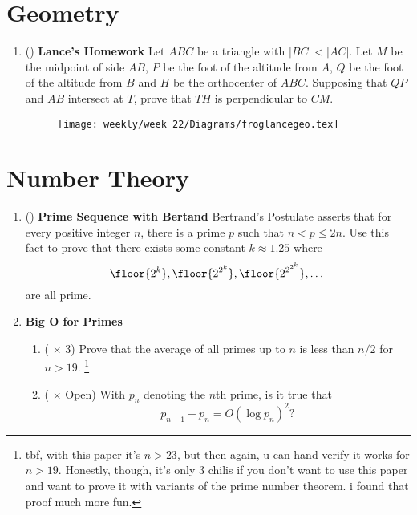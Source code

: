 \documentclass[11pt]{scrartcl}
\begin{document}
\newpage
\section{Geometry}
\begin{enumerate}[label=\textbf{G\arabic*}.]
    \item (\fullchili) \textbf{Lance's Homework} \newline
    Let $ABC$ be a triangle with $|BC| < |AC|$. Let $M$ be the midpoint of side $AB$, $P$ be the foot of the altitude from $A$, $Q$ be the foot of the altitude from $B$ and $H$ be the orthocenter of $ABC$. Supposing that $QP$ and $AB$ intersect at $T$, prove that $TH$ is perpendicular to $CM$.

    \begin{figure}[h]
        \centering
        \texttt{[image: weekly/week 22/Diagrams/froglancegeo.tex]} %
        \label{fig:froglancegeo}
    \end{figure} 
\end{enumerate}

\newpage
\section{Number Theory}
\begin{enumerate}[label=\textbf{N\arabic*}.]
    \item (\fullchili) \textbf{Prime Sequence with Bertand} \newline
    Bertrand's Postulate asserts that for every positive integer $n$, there is a prime $p$ such that $n < p \leq 2n$. Use this fact to prove that there exists some constant $k \approx 1.25$ where
    \[ \floor{2^k}, \floor{2^{2^k}}, \floor{2^{2^{2^k}}}, \dots \]
    are all prime.

    \item \textbf{Big O for Primes}
    \begin{enumerate}
        \item (\fullchili \hspace{1pt} $\times$ 3) Prove that the average of all primes up to $n$ is less than $n/2$ for $n > 19$. \footnote{tbf, with \href{https://cs.uwaterloo.ca/journals/JIS/VOL18/Axler/axler6.pdf}{this paper} it's $n > 23$, but then again, u can hand verify it works for $n > 19$. Honestly, though, it's only 3 chilis if you don't want to use this paper and want to prove it with variants of the prime number theorem. i found that proof much more fun.}

        \item (\fullchili \hspace{1pt} $\times$ Open) With $p_n$ denoting the $n$th prime, is it true that
        \[ p_{n+1} - p_{n} = O(\log p_n)^2? \]
    \end{enumerate}
\end{enumerate}
\end{document}
